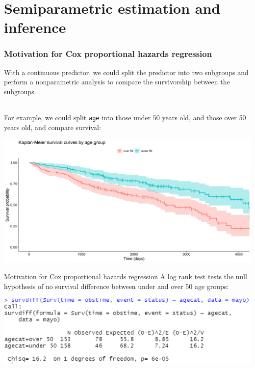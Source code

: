 \documentclass[10pt,t]{beamer}
\begin{document}
\section{Semiparametric estimation and inference}
\begin{frame}
\frametitle{Motivation for Cox proportional hazards regression}
\vspace{-0.8cm}
With a continuous predictor, we could split the predictor into two subgroups and perform a nonparametric analysis to compare the survivorship between the subgroups.
\\ ~\ 

For example, we could split \texttt{age} into those under 50 years old, and those over 50 years old, and compare survival:

\begin{center}
\includegraphics[width = \textwidth]{figs/KM_strat_age.png}
\end{center}
\end{frame}

\begin{frame}{Motivation for Cox proportional hazards regression}
	A log rank test tests the null hypothesis of no survival difference between under and over 50 age groups:
	\begin{center}
		\includegraphics[width = \textwidth]{figs/logrank_agecat.png}
	\end{center}
\end{frame}
\end{document}
